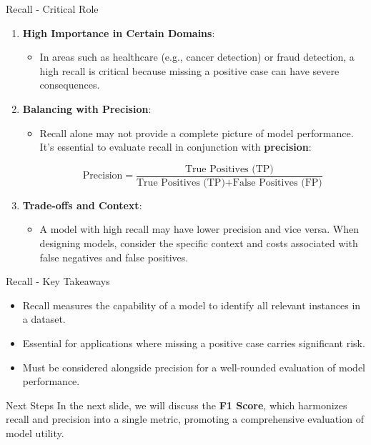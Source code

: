 \documentclass[aspectratio=169]{beamer}
\begin{document}
\begin{frame}[fragile]{Recall - Critical Role}
    \begin{enumerate}
        \item \textbf{High Importance in Certain Domains}:
            \begin{itemize}
                \item In areas such as healthcare (e.g., cancer detection) or fraud detection, a high recall is critical because missing a positive case can have severe consequences.
            \end{itemize}

        \item \textbf{Balancing with Precision}:
            \begin{itemize}
                \item Recall alone may not provide a complete picture of model performance. It's essential to evaluate recall in conjunction with \textbf{precision}:
                
                \begin{equation}
                \text{Precision} = \frac{\text{True Positives (TP)}}{\text{True Positives (TP)} + \text{False Positives (FP)}}
                \end{equation}
            \end{itemize}

        \item \textbf{Trade-offs and Context}:
            \begin{itemize}
                \item A model with high recall may have lower precision and vice versa. When designing models, consider the specific context and costs associated with false negatives and false positives.
            \end{itemize}
    \end{enumerate}
\end{frame}

\begin{frame}[fragile]{Recall - Key Takeaways}
    \begin{itemize}
        \item Recall measures the capability of a model to identify all relevant instances in a dataset.
        \item Essential for applications where missing a positive case carries significant risk.
        \item Must be considered alongside precision for a well-rounded evaluation of model performance.
    \end{itemize}

    \begin{block}{Next Steps}
        In the next slide, we will discuss the \textbf{F1 Score}, which harmonizes recall and precision into a single metric, promoting a comprehensive evaluation of model utility.
    \end{block}
\end{frame}
\end{document}
